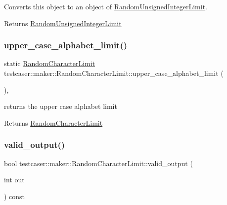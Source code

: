 Converts this object to an object of \mbox{\hyperlink{classtestcaser_1_1maker_1_1RandomUnsignedIntegerLimit}{Random\+Unsigned\+Integer\+Limit}}. 

\begin{DoxyReturn}{Returns}
\mbox{\hyperlink{classtestcaser_1_1maker_1_1RandomUnsignedIntegerLimit}{Random\+Unsigned\+Integer\+Limit}} 
\end{DoxyReturn}
\mbox{\label{classtestcaser_1_1maker_1_1RandomCharacterLimit_a7a0ee0690e97a27402faca09c6044aed}} 
\subsubsection{\texorpdfstring{upper\_case\_alphabet\_limit()}{upper\_case\_alphabet\_limit()}}
{\footnotesize\ttfamily static \mbox{\hyperlink{classtestcaser_1_1maker_1_1RandomCharacterLimit}{Random\+Character\+Limit}} testcaser\+::maker\+::\+Random\+Character\+Limit\+::upper\+\_\+case\+\_\+alphabet\+\_\+limit (\begin{DoxyParamCaption}{ }\end{DoxyParamCaption})\hspace{0.3cm}{\ttfamily [inline]}, {\ttfamily [static]}}



returns the upper case alphabet limit 

\begin{DoxyReturn}{Returns}
\mbox{\hyperlink{classtestcaser_1_1maker_1_1RandomCharacterLimit}{Random\+Character\+Limit}} 
\end{DoxyReturn}
\mbox{\label{classtestcaser_1_1maker_1_1RandomCharacterLimit_a1b3f0a14a18aa307cf4a82f834393928}} 
\subsubsection{\texorpdfstring{valid\_output()}{valid\_output()}}
{\footnotesize\ttfamily bool testcaser\+::maker\+::\+Random\+Character\+Limit\+::valid\+\_\+output (\begin{DoxyParamCaption}\item[{int}]{out }\end{DoxyParamCaption}) const\hspace{0.3cm}{\ttfamily [inline]}}




